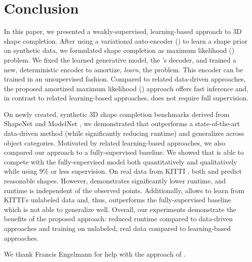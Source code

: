 \section{Conclusion}
\label{sec:conclusion}

In this paper, we presented a weakly-supervised, learning-based approach to 3D shape completion. After using a variational auto-encoder (\VAE) \cite{Kingma2013ARXIV} to learn a shape prior on synthetic data, we formulated shape completion as maximum likelihood (\ML) problem. We fixed the learned generative model, \ie the \VAE's decoder, and trained a new, deterministic encoder to amortize, \ie \emph{learn}, the \ML problem. This encoder can be trained in an unsupervised fashion. Compared to related data-driven approaches, the proposed amortized maximum likelihood (\AML) approach offers fast inference and, in contrast to related learning-based approaches, does not require full supervision.

On newly created, synthetic 3D shape completion benchmarks derived from ShapeNet \cite{Chang2015ARXIV} and ModelNet \cite{Wu2015CVPR}, we demonstrated that \AML outperforms a state-of-the-art data-driven method \cite{Engelmann2016GCPR} (while significantly reducing runtime) and generalizes across object categories.
Motivated by related learning-based approaches, we also compared our approach to a fully-supervised baseline. We showed that \AML is able to compete with the fully-supervised model both quantitatively and qualitatively while using $9\%$ or less supervision.
On real data from KITTI \cite{Geiger2012CVPR}, both \AML and \cite{Engelmann2016GCPR} predict reasonable shapes. However, \AML demonstrates significantly lower runtime, and runtime is independent of the observed points. Additionally, \AML allows to learn from KITTI's unlabeled data and, thus, outperforms the fully-supervised baseline which is not able to generalize well.
Overall, our experiments demonstrate the benefits of the proposed \AML approach: reduced runtime compared to data-driven approaches and training on unlabeled, real data compared to learning-based approaches.

%
We thank Francis Engelmann for help with the approach of \cite{Engelmann2016GCPR}.